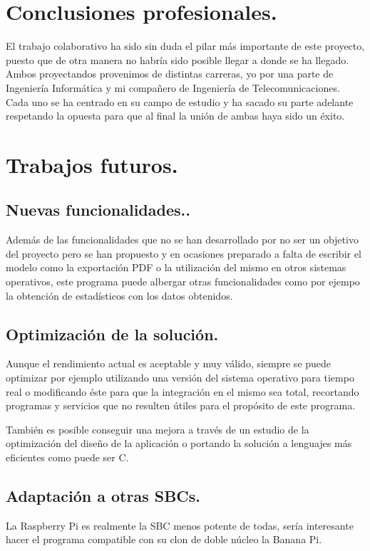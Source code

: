 	
\section{Conclusiones profesionales.}
	El trabajo colaborativo ha sido sin duda el pilar más importante de este proyecto, puesto que de otra manera no habría sido posible llegar a donde se ha llegado. Ambos proyectandos provenimos de distintas carreras, yo por una parte de Ingeniería Informática y mi compañero de Ingeniería de Telecomunicaciones. Cada uno se ha centrado en su campo de estudio y ha sacado su parte adelante respetando la opuesta para que al final la unión de ambas haya sido un éxito.
	
	
\section{Trabajos futuros.}
	\subsection{Nuevas funcionalidades..}
		Además de las funcionalidades que no se han desarrollado por no ser un objetivo del proyecto pero se han propuesto y en ocasiones preparado a falta de escribir el modelo como la exportación PDF o la utilización del mismo en otros sistemas operativos, este programa puede albergar otras funcionalidades como por ejempo la obtención de estadísticos con los datos obtenidos.
		
	\subsection{Optimización de la solución.}
		Aunque el rendimiento actual es aceptable y muy válido, siempre se puede optimizar por ejemplo utilizando una versión del sistema operativo para tiempo real o modificando éste para que la integración en el mismo sea total, recortando programas y servicios que no resulten útiles para el propósito de este programa.
		
		También es posible conseguir una mejora a través de un estudio de la optimización del diseño de la aplicación o portando la solución a lenguajes más eficientes como puede ser C.
		
	\subsection{Adaptación a otras SBCs.}
	La Raspberry Pi es realmente la SBC menos potente de todas, sería interesante hacer el programa compatible con su clon de doble núcleo la Banana Pi. 
	
